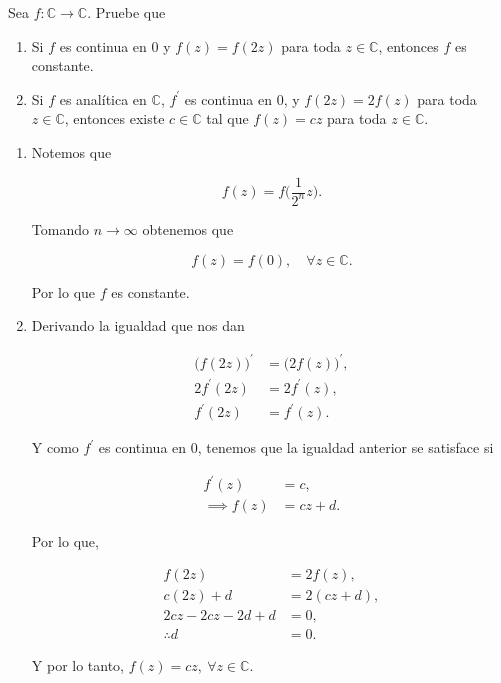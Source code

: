 \documentclass[../main.tex]{subfiles}
\begin{document}
\begin{problema}
    Sea \(f \colon \mathbb{C} \to \mathbb{C}\). Pruebe que

    \begin{enumerate}
        \item Si \(f\) es continua en 0 y \(f(z) = f(2z)\) para toda \(z\in
            \mathbb{C}\),
            entonces \(f\) es constante.
        \item Si \(f\) es analítica en \(\mathbb{C}\), \(f^{\prime}\) es
            continua en 0, y
            \(f(2z) = 2f(z)\) para toda \(z\in \mathbb{C}\), entonces existe \(c\in
            \mathbb{C}\) tal que \(f(z) = cz\) para toda \(z\in \mathbb{C}\).
    \end{enumerate}
\end{problema}

\startsolution

\begin{enumerate}
    \item
        Notemos que

        \begin{equation*}
            f(z) = f\bigl(\dfrac{1}{2^{n}}z\bigr).
        \end{equation*}

        Tomando \(n \to \infty\) obtenemos que

        \begin{equation*}
            f(z) = f(0),\quad \forall z\in \mathbb{C}.
        \end{equation*}

        Por lo que \(f\) es constante.

    \item
        Derivando la igualdad que nos dan

        \begin{align*}
            \bigl(f(2z)\bigr)^{\prime} &= \bigl(2f(z)\bigr)^{\prime},\\
            2f^{\prime}(2z) &= 2f^{\prime}(z),\\
            f^{\prime}(2z) &= f^{\prime}(z).
        \end{align*}

        Y como \(f^{\prime}\) es continua en 0, tenemos que la igualdad
        anterior se satisface si

        \begin{align*}
            f^{\prime}(z) &= c,\\
            \implies f(z) &= cz + d.
        \end{align*}

        Por lo que,

        \begin{align*}
            f(2z) &= 2f(z),\\
            c(2z) + d &= 2(cz + d),\\
            2cz - 2cz - 2d + d &= 0,\\
            \therefore d &= 0.
        \end{align*}

        Y por lo tanto, \(f(z) = cz,\medspace \forall z\in \mathbb{C}\).

\end{enumerate}
\end{document}
